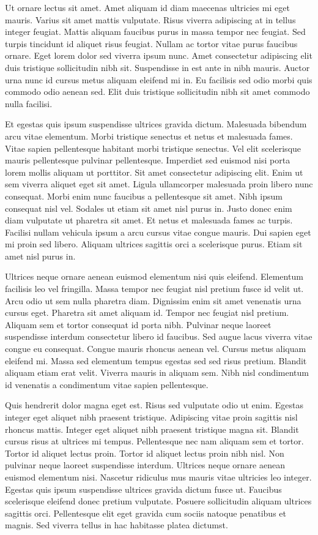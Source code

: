 \documentclass[11pt,a4paper]{article}
\begin{document}
Ut ornare lectus sit amet. Amet aliquam id diam maecenas ultricies mi eget mauris. Varius sit amet mattis vulputate. Risus viverra adipiscing at in tellus integer feugiat. Mattis aliquam faucibus purus in massa tempor nec feugiat. Sed turpis tincidunt id aliquet risus feugiat. Nullam ac tortor vitae purus faucibus ornare. Eget lorem dolor sed viverra ipsum nunc. Amet consectetur adipiscing elit duis tristique sollicitudin nibh sit. Suspendisse in est ante in nibh mauris. Auctor urna nunc id cursus metus aliquam eleifend mi in. Eu facilisis sed odio morbi quis commodo odio aenean sed. Elit duis tristique sollicitudin nibh sit amet commodo nulla facilisi.

Et egestas quis ipsum suspendisse ultrices gravida dictum. Malesuada bibendum arcu vitae elementum. Morbi tristique senectus et netus et malesuada fames. Vitae sapien pellentesque habitant morbi tristique senectus. Vel elit scelerisque mauris pellentesque pulvinar pellentesque. Imperdiet sed euismod nisi porta lorem mollis aliquam ut porttitor. Sit amet consectetur adipiscing elit. Enim ut sem viverra aliquet eget sit amet. Ligula ullamcorper malesuada proin libero nunc consequat. Morbi enim nunc faucibus a pellentesque sit amet. Nibh ipsum consequat nisl vel. Sodales ut etiam sit amet nisl purus in. Justo donec enim diam vulputate ut pharetra sit amet. Et netus et malesuada fames ac turpis. Facilisi nullam vehicula ipsum a arcu cursus vitae congue mauris. Dui sapien eget mi proin sed libero. Aliquam ultrices sagittis orci a scelerisque purus. Etiam sit amet nisl purus in.

Ultrices neque ornare aenean euismod elementum nisi quis eleifend. Elementum facilisis leo vel fringilla. Massa tempor nec feugiat nisl pretium fusce id velit ut. Arcu odio ut sem nulla pharetra diam. Dignissim enim sit amet venenatis urna cursus eget. Pharetra sit amet aliquam id. Tempor nec feugiat nisl pretium. Aliquam sem et tortor consequat id porta nibh. Pulvinar neque laoreet suspendisse interdum consectetur libero id faucibus. Sed augue lacus viverra vitae congue eu consequat. Congue mauris rhoncus aenean vel. Cursus metus aliquam eleifend mi. Massa sed elementum tempus egestas sed sed risus pretium. Blandit aliquam etiam erat velit. Viverra mauris in aliquam sem. Nibh nisl condimentum id venenatis a condimentum vitae sapien pellentesque.

Quis hendrerit dolor magna eget est. Risus sed vulputate odio ut enim. Egestas integer eget aliquet nibh praesent tristique. Adipiscing vitae proin sagittis nisl rhoncus mattis. Integer eget aliquet nibh praesent tristique magna sit. Blandit cursus risus at ultrices mi tempus. Pellentesque nec nam aliquam sem et tortor. Tortor id aliquet lectus proin. Tortor id aliquet lectus proin nibh nisl. Non pulvinar neque laoreet suspendisse interdum. Ultrices neque ornare aenean euismod elementum nisi. Nascetur ridiculus mus mauris vitae ultricies leo integer. Egestas quis ipsum suspendisse ultrices gravida dictum fusce ut. Faucibus scelerisque eleifend donec pretium vulputate. Posuere sollicitudin aliquam ultrices sagittis orci. Pellentesque elit eget gravida cum sociis natoque penatibus et magnis. Sed viverra tellus in hac habitasse platea dictumst.
\end{document}
